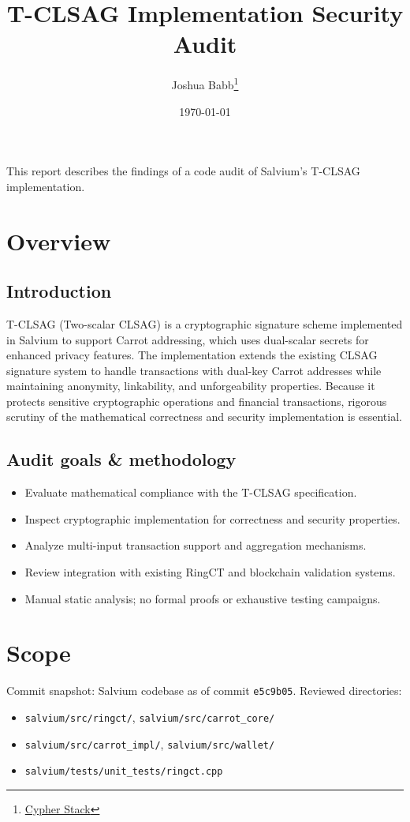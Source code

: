 \documentclass{article}
\title{T-CLSAG Implementation Security Audit}
\author{Joshua Babb\thanks{\url{Cypher Stack}}}
\date{\today}
\begin{document}
\maketitle

This report describes the findings of a code audit of Salvium's T-CLSAG implementation.

\tableofcontents

\section{Overview}
\subsection{Introduction}
T-CLSAG (Two-scalar CLSAG) is a cryptographic signature scheme implemented in 
Salvium to support Carrot addressing, which uses dual-scalar secrets for enhanced 
privacy features.  The implementation extends the existing CLSAG signature system 
to handle transactions with dual-key Carrot addresses while maintaining anonymity, 
linkability, and unforgeability properties.  Because it protects sensitive 
cryptographic operations and financial transactions, rigorous scrutiny of the 
mathematical correctness and security implementation is essential.

\subsection{Audit goals \& methodology}
\begin{itemize}
  \item Evaluate mathematical compliance with the T-CLSAG specification.
  \item Inspect cryptographic implementation for correctness and security properties.
  \item Analyze multi-input transaction support and aggregation mechanisms.
  \item Review integration with existing RingCT and blockchain validation systems.
  \item Manual static analysis; no formal proofs or exhaustive testing campaigns.
\end{itemize}

\section{Scope}
Commit snapshot: Salvium codebase as of commit \texttt{e5c9b05}.  Reviewed directories:
\begin{itemize}
  \item \texttt{salvium/src/ringct/}, \texttt{salvium/src/carrot\_core/}
  \item \texttt{salvium/src/carrot\_impl/}, \texttt{salvium/src/wallet/}
  \item \texttt{salvium/tests/unit\_tests/ringct.cpp}
\end{itemize}
\end{document}
